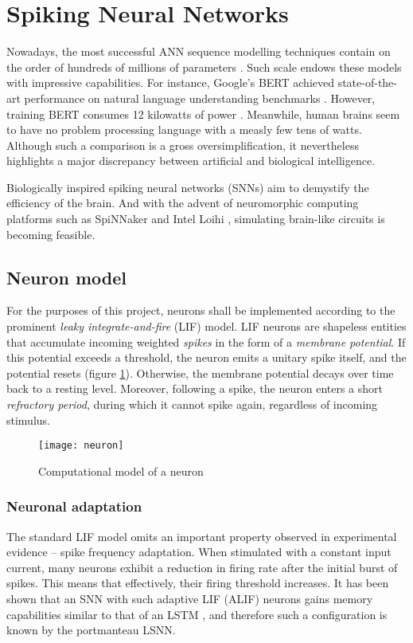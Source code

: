 \documentclass[../../report.tex]{subfiles}
\begin{document}
\section{Spiking Neural Networks}

Nowadays, the most successful ANN sequence modelling techniques contain on the
order of hundreds of millions of parameters \cite{Bender2021}. Such scale endows
these models with impressive capabilities. For instance, Google's BERT achieved
state-of-the-art performance on natural language understanding benchmarks
\cite{Devlin2019}. However, training BERT consumes 12 kilowatts of power
\cite{Strubell2019}. Meanwhile, human brains seem to have no problem processing
language with a measly few tens of watts. Although such a comparison is a gross
oversimplification, it nevertheless highlights a major discrepancy between
artificial and biological intelligence.

Biologically inspired spiking neural networks (SNNs) aim to demystify the
efficiency of the brain. And with the advent of neuromorphic computing platforms
such as SpiNNaker \cite{Furber2014} and Intel Loihi \cite{Davies2018},
simulating brain-like circuits is becoming feasible.

\subsection{Neuron model}

For the purposes of this project, neurons shall be implemented according to the
prominent \emph{leaky integrate-and-fire} (LIF) model. LIF neurons are shapeless
entities that accumulate incoming weighted \emph{spikes} in the form of a
\emph{membrane potential}. If this potential exceeds a threshold, the neuron
emits a unitary spike itself, and the potential resets (figure
\ref{fig:neuron}). Otherwise, the membrane potential decays over time back to a
resting level. Moreover, following a spike, the neuron enters a short
\emph{refractory period}, during which it cannot spike again, regardless of
incoming stimulus.

\begin{figure}
  \centering
  \texttt{[image: neuron]}
  \caption{Computational model of a neuron \cite{Lobo2020}}
  \label{fig:neuron}
\end{figure}

\subsubsection{Neuronal adaptation}
The standard LIF model omits an important property observed in experimental
evidence -- spike frequency adaptation. When stimulated with a constant input
current, many neurons exhibit a reduction in firing rate after the initial burst
of spikes. This means that effectively, their firing threshold increases. It has
been shown that an SNN with such adaptive LIF (ALIF) neurons gains memory
capabilities similar to that of an LSTM \cite{Bellec2018LSNN}, and therefore
such a configuration is known by the portmanteau LSNN.
\end{document}
